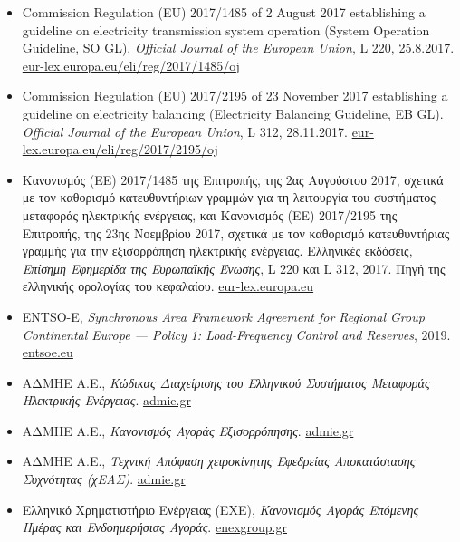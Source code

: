 \begin{itemize}
\item Commission Regulation (EU) 2017/1485 of 2 August 2017 establishing a guideline on
      electricity transmission system operation (System Operation Guideline, SO GL).
      \textit{Official Journal of the European Union}, L 220, 25.8.2017.
      \href{https://eur-lex.europa.eu/eli/reg/2017/1485/oj}{eur-lex.europa.eu/eli/reg/2017/1485/oj}
\item Commission Regulation (EU) 2017/2195 of 23 November 2017 establishing a guideline on
      electricity balancing (Electricity Balancing Guideline, EB GL). \textit{Official Journal
      of the European Union}, L 312, 28.11.2017.
      \href{https://eur-lex.europa.eu/eli/reg/2017/2195/oj}{eur-lex.europa.eu/eli/reg/2017/2195/oj}
\item Κανονισμός (ΕΕ) 2017/1485 της Επιτροπής, της 2ας Αυγούστου 2017, σχετικά με τον
      καθορισμό κατευθυντήριων γραμμών για τη λειτουργία του συστήματος μεταφοράς
      ηλεκτρικής ενέργειας, και Κανονισμός (ΕΕ) 2017/2195 της Επιτροπής, της 23ης Νοεμβρίου
      2017, σχετικά με τον καθορισμό κατευθυντήριας γραμμής για την εξισορρόπηση ηλεκτρικής
      ενέργειας. Ελληνικές εκδόσεις, \textit{Επίσημη Εφημερίδα της Ευρωπαϊκής Ένωσης},
      L 220 και L 312, 2017. Πηγή της ελληνικής ορολογίας του κεφαλαίου.
      \href{https://eur-lex.europa.eu/legal-content/EL/TXT/?uri=CELEX:32017R1485}{eur-lex.europa.eu}
\item ENTSO-E, \textit{Synchronous Area Framework Agreement for Regional Group Continental
      Europe --- Policy 1: Load-Frequency Control and Reserves}, 2019.
      \href{https://www.entsoe.eu/}{entsoe.eu}
\item ΑΔΜΗΕ Α.Ε., \textit{Κώδικας Διαχείρισης του Ελληνικού Συστήματος Μεταφοράς Ηλεκτρικής
      Ενέργειας}. \href{https://www.admie.gr/}{admie.gr}
\item ΑΔΜΗΕ Α.Ε., \textit{Κανονισμός Αγοράς Εξισορρόπησης}. \href{https://www.admie.gr/}{admie.gr}
\item ΑΔΜΗΕ Α.Ε., \textit{Τεχνική Απόφαση χειροκίνητης Εφεδρείας Αποκατάστασης Συχνότητας
      (χΕΑΣ)}. \href{https://www.admie.gr/}{admie.gr}
\item Ελληνικό Χρηματιστήριο Ενέργειας (ΕΧΕ), \textit{Κανονισμός Αγοράς Επόμενης Ημέρας και
      Ενδοημερήσιας Αγοράς}. \href{https://www.enexgroup.gr/}{enexgroup.gr}
\end{itemize}
